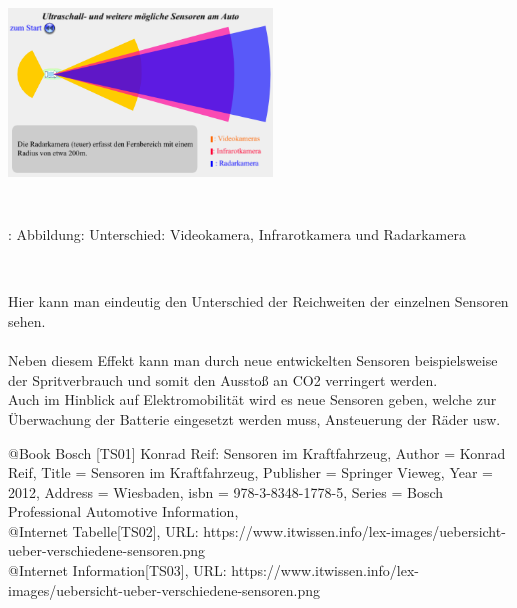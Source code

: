  			\begin{center}
 				\includegraphics[width=7cm, height=5cm] {Images/Kapitel5/radarsensor.png}
 				\caption {\\\cite{TS34}: Abbildung: Unterschied: Videokamera, Infrarotkamera und Radarkamera}
 			\end{center}\\

			\begin{flushleft}
							
				Hier kann man eindeutig den Unterschied der Reichweiten der einzelnen Sensoren sehen.\\
				\\
				
				Neben diesem Effekt kann man durch neue entwickelten Sensoren beispielsweise der Spritverbrauch und somit den Ausstoß an CO2 verringert werden.\\
				Auch im Hinblick auf Elektromobilität wird es neue Sensoren geben, welche zur Überwachung der Batterie eingesetzt werden muss, Ansteuerung der Räder usw.
				
			\end{flushleft} 
			







@Book{ 
	Bosch [TS01] 
	Konrad Reif: 		Sensoren im Kraftfahrzeug,
	Author		= 		Konrad Reif,
	Title		=		Sensoren im Kraftfahrzeug,
	Publisher	=		Springer Vieweg,
	Year		=		2012,
	Address		=		Wiesbaden,
	isbn 		= 		978-3-8348-1778-5,
	Series 		=		{Bosch Professional Automotive Information},
}
\\

@Internet{ Tabelle[TS02],
URL: https://www.itwissen.info/lex-images/uebersicht-ueber-verschiedene-sensoren.png}
\\

@Internet{ Information[TS03],
	URL: https://www.itwissen.info/lex-images/uebersicht-ueber-verschiedene-sensoren.png}
\\

